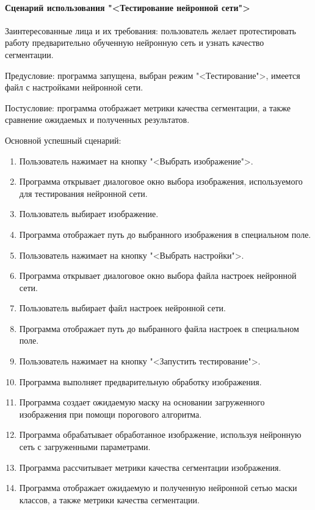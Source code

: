 \paragraph{Сценарий использования "<Тестирование нейронной сети">}

Заинтересованные лица и их требования: пользователь желает протестировать работу предварительно обученную нейронную сеть и узнать качество сегментации.

Предусловие: программа запущена, выбран режим "<Тестирование">, имеется файл с настройками нейронной сети.

Постусловие: программа отображает метрики качества сегментации, а также сравнение ожидаемых и полученных результатов.

Основной успешный сценарий:

\begin{enumerate}
	\item Пользователь нажимает на кнопку "<Выбрать изображение">.
	\item Программа открывает диалоговое окно выбора изображения, используемого для тестирования нейронной сети.
	\item Пользователь выбирает изображение.
	\item Программа отображает путь до выбранного изображения в специальном поле.
	\item Пользователь нажимает на кнопку "<Выбрать настройки">.
	\item Программа открывает диалоговое окно выбора файла настроек нейронной сети.
	\item Пользователь выбирает файл настроек нейронной сети.
	\item Программа отображает путь до выбранного файла настроек в специальном поле.
	\item Пользователь нажимает на кнопку "<Запустить тестирование">.
	\item Программа выполняет предварительную обработку изображения.
	\item Программа создает ожидаемую маску на основании загруженного изображения при помощи порогового алгоритма.
	\item Программа обрабатывает обработанное изображение, используя нейронную сеть с загруженными параметрами.
	\item Программа рассчитывает метрики качества сегментации изображения.
	\item Программа отображает ожидаемую и полученную нейронной сетью маски классов, а также метрики качества сегментации.
\end{enumerate}

